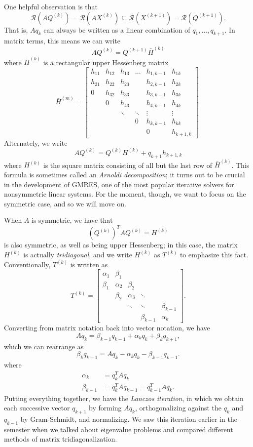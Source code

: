 \documentclass[12pt, leqno]{article}
\newcommand{\calR}{\mathcal{R}}
\begin{document}
One helpful observation is that
\[
  \calR(AQ^{(k)}) = \calR(AX^{(k)}) \subseteq
  \calR(X^{(k+1)}) = \calR(Q^{(k+1)}).
  \]
That is, $Aq_k$ can always be written as a linear combination
of $q_1, \ldots, q_{k+1}$.  In matrix terms, this means we can write
\[
  AQ^{(k)} = Q^{(k+1)} \bar{H}^{(k)}
\]
where $\bar{H}^{(k)}$ is a rectangular upper Hessenberg matrix
\[
\bar{H}^{(m)} =
\begin{bmatrix}
  h_{11} & h_{12} & h_{13} & \ldots & h_{1,k-1} & h_{1k} \\
  h_{21} & h_{22} & h_{23} &        & h_{2,k-1} & h_{2k} \\
  0     & h_{32} & h_{33} &        & h_{3,k-1} & h_{3k} \\
        & 0      & h_{43} &       & h_{4,k-1} & h_{4k} \\
        &        & \ddots & \ddots & \vdots & \vdots \\
        &        &        & 0      &  h_{k,k-1} & h_{kk} \\
        &        &        &        &  0        & h_{k+1,k}
\end{bmatrix}.
\]
Alternately, we write
\[
  AQ^{(k)} = Q^{(k)} H^{(k)} + q_{k+1} h_{k+1,k}
\]
where $H^{(k)}$ is the square matrix consisting of all but the last
row of $\bar{H}^{(k)}$.  This formula is sometimes called an
{\em Arnoldi decomposition}; it turns out to be crucial in the
development of GMRES, one of the most popular iterative solvers for
nonsymmetric linear systems.  For the moment, though, we want to
focus on the symmetric case, and so we will move on.

When $A$ is symmetric, we have that
\[
  (Q^{(k)})^T A Q^{(k)} = H^{(k)}
\]
is also symmetric, as well as being upper Hessenberg; in this case,
the matrix $H^{(k)}$ is actually {\em tridiagonal}, and we write
$H^{(k)}$ as $T^{(k)}$ to emphasize this fact.  Conventionally,
$T^{(k)}$ is written as
\[
T^{(k)} =
\begin{bmatrix}
  \alpha_1 & \beta_1 \\
  \beta_1 & \alpha_2 & \beta_2 \\
          & \beta_2 & \alpha_3 & \ddots \\
          &         & \ddots & \ddots & \beta_{k-1} \\
          &         &        & \beta_{k-1} & \alpha_k
\end{bmatrix}.
\]
Converting from matrix notation back into vector notation, we have
\[
  A q_{k} = \beta_{k-1} q_{k-1} + \alpha_k q_k + \beta_k q_{k+1},
\]
which we can rearrange as
\[
  \beta_k q_{k+1} = A q_k - \alpha_k q_k - \beta_{k-1} q_{k-1}.
\]
where
\begin{align*}
  \alpha_k &= q_k^T A q_k \\
  \beta_{k-1} &= q_k^T A q_{k-1} = q_{k-1}^T A q_k.
\end{align*}
Putting everything together, we have the {\em Lanczos iteration},
in which we obtain each successive vector $q_{k+1}$ by forming $Aq_k$,
orthogonalizing against the $q_k$ and $q_{k-1}$ by Gram-Schmidt,
and normalizing.  We saw this iteration earlier in the semester
when we talked about eigenvalue problems and compared different
methods of matrix tridiagonalization.
\end{document}
